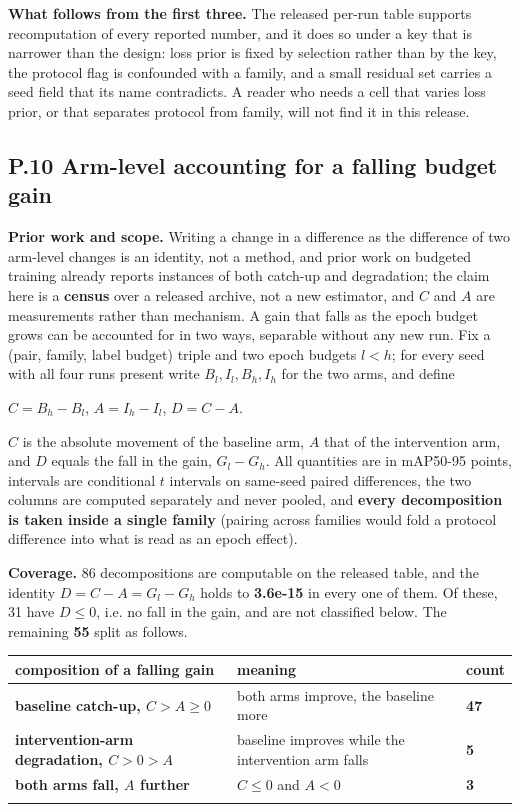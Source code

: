 \documentclass[pdflatex,sn-mathphys-ay]{sn-jnl}
\begin{document}
\textbf{What follows from the first three.} The released per-run table supports recomputation of every reported number, and it does so under a key that is narrower than the design: loss prior is fixed by selection rather than by the key, the protocol flag is confounded with a family, and a small residual set carries a seed field that its name contradicts. A reader who needs a cell that varies loss prior, or that separates protocol from family, will not find it in this release.

\subsection*{P.10 Arm-level accounting for a falling budget gain}

\textbf{Prior work and scope.} Writing a change in a difference as the difference of two arm-level changes is an identity, not a method, and prior work on budgeted training already reports instances of both catch-up and degradation; the claim here is a \textbf{census} over a released archive, not a new estimator, and $C$ and $A$ are measurements rather than mechanism. A gain that falls as the epoch budget grows can be accounted for in two ways, separable without any new run. Fix a (pair, family, label budget) triple and two epoch budgets $l<h$; for every seed with all four runs present write $B_l,I_l,B_h,I_h$ for the two arms, and define

$C=B_h-B_l$, $A=I_h-I_l$, $D=C-A$.

$C$ is the absolute movement of the baseline arm, $A$ that of the intervention arm, and $D$ equals the fall in the gain, $G_l-G_h$. All quantities are in mAP50-95 points, intervals are conditional $t$ intervals on same-seed paired differences, the two columns are computed separately and never pooled, and \textbf{every decomposition is taken inside a single family} (pairing across families would fold a protocol difference into what is read as an epoch effect).

\textbf{Coverage.} 86 decompositions are computable on the released table, and the identity $D=C-A=G_l-G_h$ holds to \textbf{3.6e-15} in every one of them. Of these, 31 have $D\le0$, i.e. no fall in the gain, and are not classified below. The remaining \textbf{55} split as follows.

{\footnotesize
\setlength{\tabcolsep}{4pt}
\begin{longtable}{p{}p{}>{\raggedleft\arraybackslash}p{}}
\toprule
composition of a falling gain & meaning & count \\
\midrule
\endhead
\textbf{baseline catch-up, $C>A\ge0$} & both arms improve, the baseline more & \textbf{47} \\
\textbf{intervention-arm degradation, $C>0>A$} & baseline improves while the intervention arm falls & \textbf{5} \\
\textbf{both arms fall, $A$ further} & $C\le0$ and $A<0$ & \textbf{3} \\
\botrule
\end{longtable}}
\end{document}
